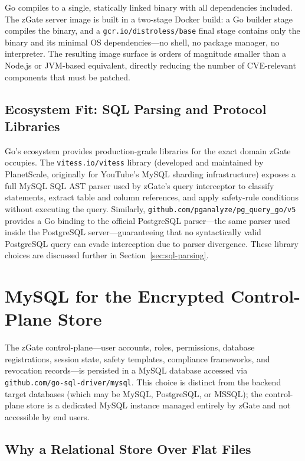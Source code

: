 Go compiles to a single, statically linked binary with all dependencies included. The zGate server image is built in a two-stage Docker build: a Go builder stage compiles the binary, and a \texttt{gcr.io/distroless/base} final stage contains only the binary and its minimal OS dependencies---no shell, no package manager, no interpreter. The resulting image surface is orders of magnitude smaller than a Node.js or JVM-based equivalent, directly reducing the number of CVE-relevant components that must be patched.

\subsection{Ecosystem Fit: SQL Parsing and Protocol Libraries}

Go's ecosystem provides production-grade libraries for the exact domain zGate occupies. The \texttt{vitess.io/vitess} library (developed and maintained by PlanetScale, originally for YouTube's MySQL sharding infrastructure) exposes a full MySQL SQL AST parser used by zGate's query interceptor to classify statements, extract table and column references, and apply safety-rule conditions without executing the query. Similarly, \texttt{github.com/pganalyze/pg\_query\_go/v5} provides a Go binding to the official PostgreSQL parser---the same parser used inside the PostgreSQL server---guaranteeing that no syntactically valid PostgreSQL query can evade interception due to parser divergence. These library choices are discussed further in Section~\ref{sec:sql-parsing}.

\section{MySQL for the Encrypted Control-Plane Store}
\label{sec:mysql-store}

The zGate control-plane---user accounts, roles, permissions, database registrations, session state, safety templates, compliance frameworks, and revocation records---is persisted in a MySQL database accessed via \texttt{github.com/go-sql-driver/mysql}. This choice is distinct from the backend target databases (which may be MySQL, PostgreSQL, or MSSQL); the control-plane store is a dedicated MySQL instance managed entirely by zGate and not accessible by end users.

\subsection{Why a Relational Store Over Flat Files}

